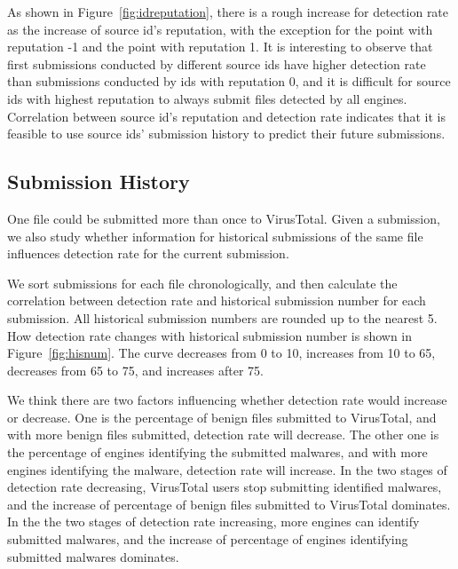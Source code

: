As shown in Figure~\ref{fig:idreputation}, 
there is a rough increase for detection rate as the increase of source id's reputation, 
with the exception for the point with reputation -1 and the point with reputation 1. 
It is interesting to observe that first submissions conducted by different source ids have higher 
detection rate than submissions conducted by ids with reputation 0, 
and it is difficult for source ids with highest reputation to always submit files detected by all engines. 
Correlation between source id's reputation and detection rate indicates 
that it is feasible to use source ids' submission history to predict their future submissions.



\subsection{Submission History}
\label{sec:history}



One file could be submitted more than once to VirusTotal. 
Given a submission, we also study whether information for historical 
submissions of the same file influences detection rate for the current submission. 

We sort submissions for each file chronologically, 
and then calculate the correlation between detection rate and historical submission number for each submission. 
All historical submission numbers are rounded up to the nearest 5. 
How detection rate changes with historical submission number is shown in Figure~\ref{fig:hisnum}. 
The curve decreases from 0 to 10, increases from 10 to 65, decreases from 65 to 75, and increases after 75. 

We think there are two factors influencing whether detection rate would increase or decrease.
One is the percentage of benign files submitted to VirusTotal, 
and with more benign files submitted, detection rate will decrease.   
The other one is the percentage of engines identifying the submitted malwares, 
and with more engines identifying the malware, detection rate will increase. 
In the two stages of detection rate decreasing, 
VirusTotal users stop submitting identified malwares, 
and the increase of percentage of benign files submitted to VirusTotal dominates. 
In the the two stages of detection rate increasing, 
more engines can identify submitted malwares, 
and the increase of percentage of engines identifying submitted malwares dominates. 

